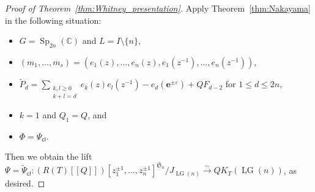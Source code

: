 \documentclass[a4paper, 11pt, reqno]{amsart}
\numberwithin{equation}{section}
\newcommand{\BC}{\mathbb{C}}
\newcommand{\FS}{\mathfrak{S}}
\newcommand{\ve}{\varepsilon}
\newcommand{\e}{\mathbf{e}}
\newcommand{\cl}{\mathsf{cl}}
\newcommand{\Sp}[1]{\operatorname{Sp}_{#1}(\BC)}
\newcommand{\LG}{\operatorname{LG}}
\newcommand{\bra}[1]{[\![ #1 ]\!]}
\newcommand{\ti}[1]{\widetilde{#1}}
\theoremstyle{plain}
\theoremstyle{definition}
\theoremstyle{remark}
\begin{document}
\begin{proof}[Proof of Theorem~\ref{thm:Whitney_presentation}]
Apply Theorem~\ref{thm:Nakayama} in the following situation: 
\begin{itemize}
\item $G = \Sp{2n}$ and $L = I \setminus \{n\}$, 
\item $(m_{1}, \ldots, m_{s}) = (e_{1}(z), \ldots, e_{n}(z), e_{1}(z^{-1}), \ldots, e_{n}(z^{-1}))$, 
\item $\ti{P}_{d} = \displaystyle\sum_{\substack{k, l \ge 0 \\ k+l=d}} e_{k}(z) e_{l}(z^{-1}) - e_{d}(\e^{\pm \ve}) + QF_{d-2}$ for $1 \le d \le 2n$, 
\item $k = 1$ and $Q_{1} = Q$, and 
\item $\Phi = \Psi_{\cl}$. 
\end{itemize}
Then we obtain the lift $\Psi = \ti{\Psi}_{\cl}: (R(T)\bra{Q})[z_{1}^{\pm 1}, \ldots, z_{n}^{\pm 1}]^{\FS_{n}}/J_{\LG(n)} \xrightarrow{\sim} QK_{T}(\LG(n))$, as desired. 
\end{proof}
\end{document}
